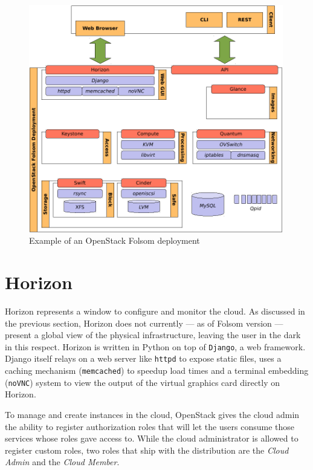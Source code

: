 \begin{figure}[tbp]
\begin{center}
\includegraphics[width=0.99\textwidth]{imagenes/011.pdf}
 \caption{Example of an OpenStack Folsom deployment}
\label{fig:despliegueos}
\end{center}
\end{figure}

\section{Horizon}\label{sec:horizon}
\noindent Horizon represents a window to configure and monitor the cloud. As discussed in the previous section, Horizon does not currently --- as of Folsom version --- present a global view of the physical infrastructure, leaving the user in the dark in this respect. Horizon is written in Python on top of \texttt{Django}, a web framework. Django itself relays on a web server like \texttt{httpd} to expose static files, uses a caching mechanism (\texttt{memcached}) to speedup load times and a terminal embedding (\texttt{noVNC}) system to view the output of the virtual graphics card directly on Horizon.

To manage and create instances in the cloud, OpenStack gives the cloud admin the ability to register authorization roles that will let the users consume those services whose roles gave access to. While the cloud administrator is allowed to register custom roles, two roles that ship with the distribution are the \emph{Cloud Admin} and the \emph{Cloud Member}.

